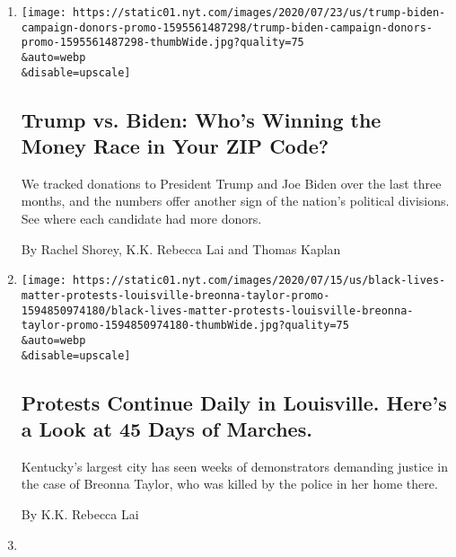 \begin{enumerate}
\def\labelenumi{\arabic{enumi}.}
\item
  \href{/interactive/2020/07/24/us/politics/trump-biden-campaign-donors.html}{}

  \texttt{[image: https://static01.nyt.com/images/2020/07/23/us/trump-biden-campaign-donors-promo-1595561487298/trump-biden-campaign-donors-promo-1595561487298-thumbWide.jpg?quality=75\\\&auto=webp\\\&disable=upscale]}

  \hypertarget{trump-vs-biden-whos-winning-the-money-race-in-your-zip-code}{%
  \subsection{Trump vs. Biden: Who's Winning the Money Race in Your ZIP
  Code?}\label{trump-vs-biden-whos-winning-the-money-race-in-your-zip-code}}

  We tracked donations to President Trump and Joe Biden over the last
  three months, and the numbers offer another sign of the nation's
  political divisions. See where each candidate had more donors.

  By Rachel Shorey, K.K. Rebecca Lai and Thomas Kaplan
\item
  \href{/interactive/2020/07/16/us/black-lives-matter-protests-louisville-breonna-taylor.html}{}

  \texttt{[image: https://static01.nyt.com/images/2020/07/15/us/black-lives-matter-protests-louisville-breonna-taylor-promo-1594850974180/black-lives-matter-protests-louisville-breonna-taylor-promo-1594850974180-thumbWide.jpg?quality=75\\\&auto=webp\\\&disable=upscale]}

  \hypertarget{protests-continue-daily-in-louisville-heres-a-look-at-45-days-of-marches}{%
  \subsection{Protests Continue Daily in Louisville. Here's a Look at 45
  Days of
  Marches.}\label{protests-continue-daily-in-louisville-heres-a-look-at-45-days-of-marches}}

  Kentucky's largest city has seen weeks of demonstrators demanding
  justice in the case of Breonna Taylor, who was killed by the police in
  her home there.

  By K.K. Rebecca Lai
\item
  \href{/es/interactive/2020/07/09/espanol/mundo/coronavirus-latinos-africanoamericanos-datos.html}{}


\end{enumerate}
